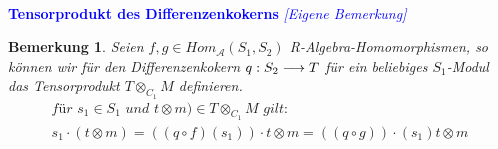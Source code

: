 \documentclass[10pt,a4paper]{report}
\newcommand{\comment}[1]{}
\newcounter{Aussage}[chapter]
\newtheorem{bem}[Aussage]{Bemerkung}
\newcommand{\functionfront}[3]{\nolinebreak{#1:#2 \longrightarrow #3}}
\newcommand{\Tensor}[3]{#1 \otimes_{#2} #3}
\newcommand{\tensor}[3]{#1 \otimes #3}
\begin{document}
\ \\
\textcolor{blue}{\textbf{Tensorprodukt des Differenzenkokerns} \textit{[Eigene Bemerkung]}}
\begin{bem} \comment{\label{Tensorprodukt des Differenzenkokerns}}
Seien $f,g \in Hom_{\mathcal{A}}(S_1,S_2)$ R-Algebra-Homomorphismen, so können wir für den Differenzenkokern $\functionfront{q}{S_2}{T}$ für ein beliebiges $S_1$-Modul das Tensorprodukt $\Tensor{T}{C_1}{M}$ definieren. 
\begin{gather*}
\textit{für } s_1 \in S_1 \textit{ und } \tensor{t}{S_1}{m}) \in \Tensor{T}{C_1}{M} \textit{ gilt: }\\
s_1 \cdot (\tensor{t}{S_1}{m}) = \tensor{((q \circ f)(s_1)) \cdot t}{S_1}{m} = \tensor{((q \circ g)) \cdot (s_1)t}{S_1}{m}
\end{gather*}
\end{bem}
\end{document}
